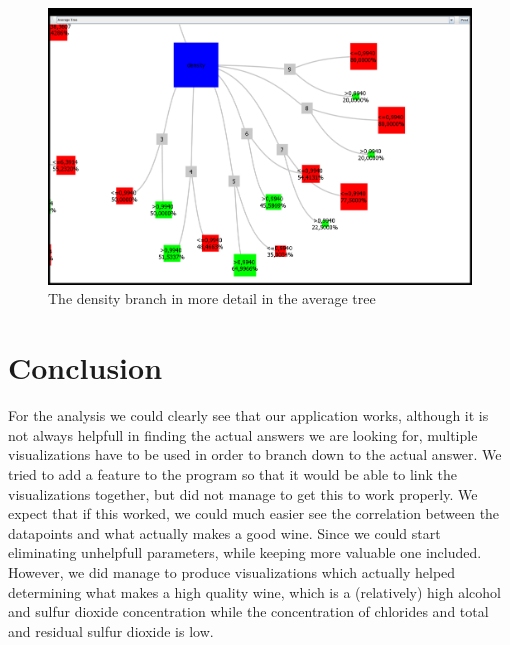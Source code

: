 \documentclass[a4paper,twoside,11pt]{article}
\begin{document}
\begin{figure}[!h]
  \centering
  \includegraphics[width=\textwidth]{images/AverageTree.png}
  \caption{The density branch in more detail in the average tree}
  \label{rsmt}
\end{figure}

\section{Conclusion}
For the analysis we could clearly see that our application works, although it is not always helpfull in finding the actual answers we are looking for, multiple visualizations have to be used in order to branch down to the actual answer. We tried to add a feature to the program so that it would be able to link the visualizations together, but did not manage to get this to work properly. We expect that if this worked, we could much easier see the correlation between the datapoints and what actually makes a good wine. Since we could start eliminating unhelpfull parameters, while keeping more valuable one included. \\

However, we did manage to produce visualizations which actually helped determining what makes a high quality wine, which is a (relatively) high alcohol and sulfur dioxide concentration while the concentration of chlorides and total and residual sulfur dioxide is low.
\end{document}
